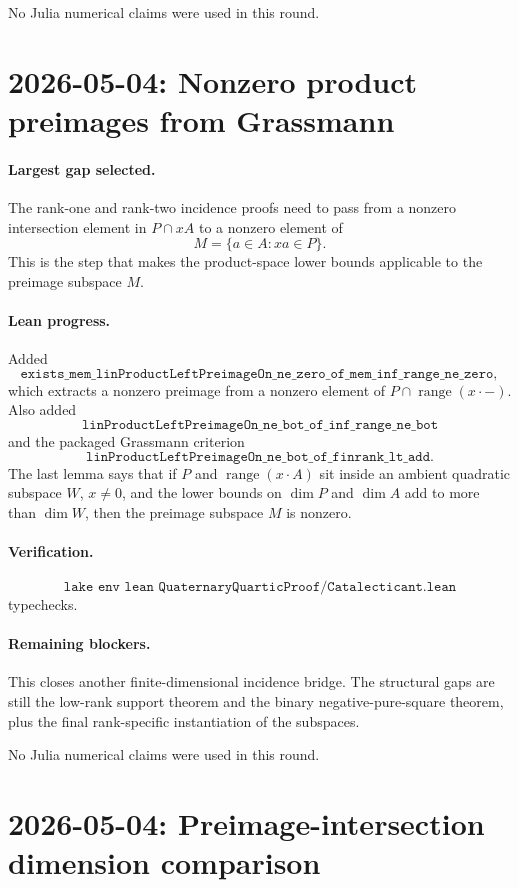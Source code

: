 \documentclass[11pt]{article}
\begin{document}
No Julia numerical claims were used in this round.

\section*{2026-05-04: Nonzero product preimages from Grassmann}

\paragraph{Largest gap selected.}
The rank-one and rank-two incidence proofs need to pass from a nonzero
intersection element in \(P\cap xA\) to a nonzero element of
\[
M=\{a\in A:xa\in P\}.
\]
This is the step that makes the product-space lower bounds applicable to the
preimage subspace \(M\).

\paragraph{Lean progress.}
Added
\[
\texttt{exists\_mem\_linProductLeftPreimageOn\_ne\_zero\_of\_mem\_inf\_range\_ne\_zero},
\]
which extracts a nonzero preimage from a nonzero element of
\(P\cap\operatorname{range}(x\cdot-)\).  Also added
\[
\texttt{linProductLeftPreimageOn\_ne\_bot\_of\_inf\_range\_ne\_bot}
\]
and the packaged Grassmann criterion
\[
\texttt{linProductLeftPreimageOn\_ne\_bot\_of\_finrank\_lt\_add}.
\]
The last lemma says that if \(P\) and \(\operatorname{range}(x\cdot A)\) sit
inside an ambient quadratic subspace \(W\), \(x\neq0\), and the lower bounds
on \(\dim P\) and \(\dim A\) add to more than \(\dim W\), then the preimage
subspace \(M\) is nonzero.

\paragraph{Verification.}
\[
\texttt{lake env lean QuaternaryQuarticProof/Catalecticant.lean}
\]
typechecks.

\paragraph{Remaining blockers.}
This closes another finite-dimensional incidence bridge.  The structural
gaps are still the low-rank support theorem and the binary negative-pure-square
theorem, plus the final rank-specific instantiation of the subspaces.

No Julia numerical claims were used in this round.

\section*{2026-05-04: Preimage-intersection dimension comparison}
\end{document}
